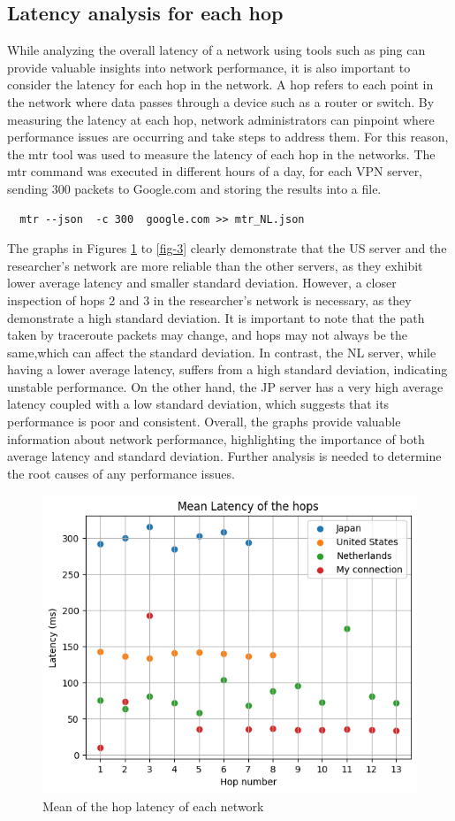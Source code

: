 \documentclass[eng]{class}
\begin{document}
\subsection{Latency analysis for each hop}
While analyzing the overall latency of a network using tools such as ping can provide valuable insights into network performance,
it is also important to consider the latency for each hop in the network.
A hop refers to each point in the network where data passes through a device such as a router or switch. By measuring the latency at each hop,
network administrators can pinpoint where performance issues are occurring and take steps to address them.
For this reason, the mtr tool was used to measure the latency of each hop in the networks.
The mtr command was executed in different hours of a day, for each VPN server, sending 300 packets to Google.com and storing the results into a file.
\begin{lstlisting}
  mtr --json  -c 300  google.com >> mtr_NL.json
\end{lstlisting}
The graphs in Figures \ref{fig-2} to \ref{fig-3} clearly demonstrate that the US server and the researcher's network are more reliable than the other servers,
as they exhibit lower average latency and smaller standard deviation. However, a closer inspection of hops 2 and 3 in the researcher's network is necessary,
as they demonstrate a high standard deviation.
It is important to note that the path taken by traceroute packets may change, and hops may not always be the same,which can affect the standard deviation.
In contrast, the NL server, while having a lower average latency, suffers from a high standard deviation, indicating unstable performance.
On the other hand, the JP server has a very high average latency coupled with a low standard deviation, which suggests that its performance is poor and consistent.
Overall, the graphs provide valuable information about network performance, highlighting the importance of both average latency and standard deviation.
Further analysis is needed to determine the root causes of any performance issues.
\begin{figure}[H]
    \centering
    \includegraphics[width=.7\columnwidth]{images/meanLHops.png}
    \caption{Mean of the hop latency of each network}
    \label{fig-2}
\end{figure}
\end{document}
